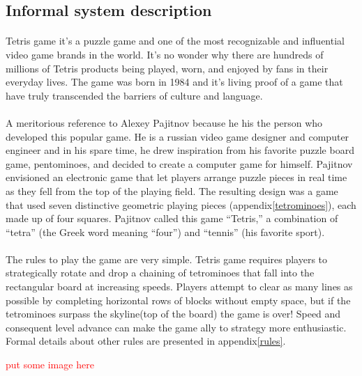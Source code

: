 \documentclass[a4paper]{article}
\begin{document}
\subsection{Informal system description}
\label{informal-rules}

\paragraph{ }Tetris game it's a puzzle game and one of the most recognizable and influential video game brands in the world. It’s no wonder why there are hundreds of millions of Tetris products being played, worn, and enjoyed by fans in their everyday lives. The game was born in 1984 and it's living proof of a game that have truly transcended the barriers of culture and language.

\paragraph{ }A meritorious reference to Alexey Pajitnov because he his the person who developed this popular game. He is a russian video game designer and computer engineer and in his spare time, he drew inspiration from his favorite puzzle board game, pentominoes, and decided to create a computer game for himself. Pajitnov envisioned an electronic game that let players arrange puzzle pieces in real time as they fell from the top of the playing field. The resulting design was a game that used seven distinctive geometric playing pieces (appendix\ref{tetrominoes}), each made up of four squares. Pajitnov called this game “Tetris,” a combination of “tetra” (the Greek word meaning “four”) and “tennis” (his favorite sport).

\paragraph{ }The rules to play the game are very simple. Tetris game requires players to strategically rotate and drop a chaining of tetrominoes that fall into the rectangular board at increasing speeds. Players attempt to clear as many lines as possible by completing horizontal rows of blocks without empty space, but if the tetrominoes surpass the skyline(top of the board) the game is over! Speed and consequent level advance can make the game ally to strategy more enthusiastic. Formal details about other rules are presented in appendix\ref{rules}.

\textcolor{red}{put some image here}
\end{document}
